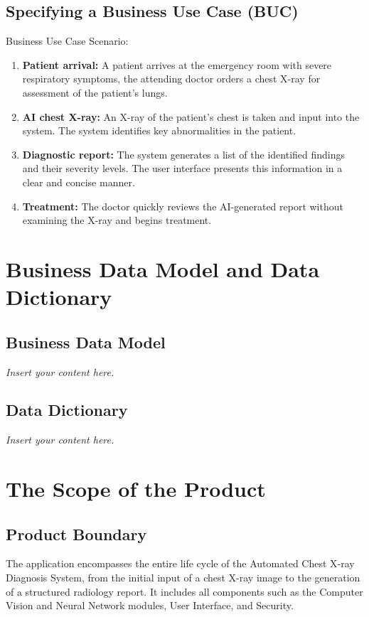 \documentclass[12pt]{article}
\newcommand{\lips}{\textit{Insert your content here.}}
\begin{document}
\subsection{Specifying a Business Use Case (BUC)}
Business Use Case Scenario: 
\begin{enumerate}
    \item \textbf{Patient arrival:} A patient arrives at the emergency room with severe respiratory symptoms, the attending doctor orders a chest X-ray for assessment of the patient’s lungs. 
    \item \textbf{AI chest X-ray:} An X-ray of the patient’s chest is taken and input into the system. The system identifies key abnormalities in the patient. 
    \item \textbf{Diagnostic report:} The system generates a list of the identified findings and their severity levels. The user interface presents this information in a clear and concise manner. 
    \item \textbf{Treatment:} The doctor quickly reviews the AI-generated report without examining the X-ray and begins treatment. 
\end{enumerate}  

\section{Business Data Model and Data Dictionary}
\subsection{Business Data Model}
\lips
\subsection{Data Dictionary}
\lips

\section{The Scope of the Product}
\subsection{Product Boundary}
The application encompasses the entire life cycle of the Automated Chest X-ray Diagnosis System, from the initial input of a chest X-ray image to the generation of a structured radiology report. It includes all components such as the Computer Vision and Neural Network modules, User Interface, and Security. 
\end{document}
